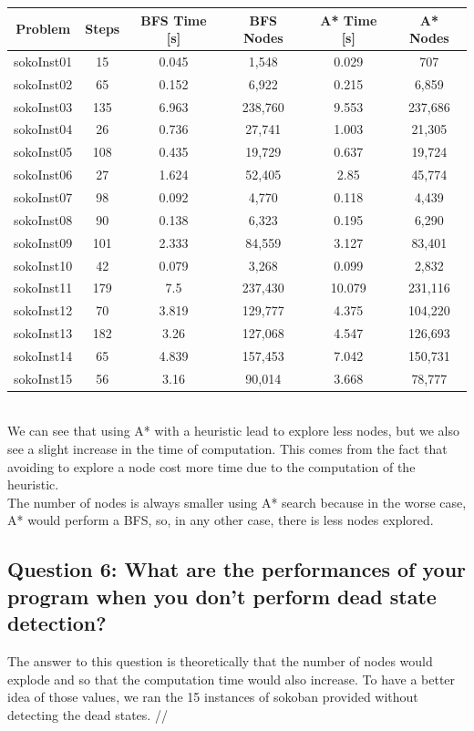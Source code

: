 \documentclass[a4paper,10pt]{article}
\begin{document}
			\begin{tabular}{|c||c||c|c||c|c|}
				\hline 
				\textbf{Problem} & \textbf{Steps} & \textbf{BFS Time [s]} & \textbf{BFS Nodes} & \textbf{A* Time [s]} & \textbf{A* Nodes} \\ 
				\hline 
				sokoInst01 & 15 & 0.045 & 1,548 & 0.029 & 707 \\ 
				\hline
				sokoInst02 & 65 & 0.152 & 6,922 & 0.215 & 6,859 \\ 
				\hline
				sokoInst03 & 135 & 6.963 & 238,760 & 9.553 & 237,686 \\ 
				\hline
				sokoInst04 & 26 & 0.736 & 27,741 & 1.003 & 21,305 \\ 
				\hline
				sokoInst05 & 108 & 0.435 & 19,729 & 0.637 & 19,724 \\ 
				\hline
				sokoInst06 & 27 & 1.624 & 52,405 & 2.85 & 45,774 \\ 
				\hline
				sokoInst07 & 98 & 0.092 & 4,770 & 0.118 & 4,439 \\ 
				\hline
				sokoInst08 & 90 & 0.138 & 6,323 & 0.195 & 6,290 \\ 
				\hline
				sokoInst09 & 101 & 2.333 & 84,559 & 3.127 & 83,401 \\ 
				\hline
				sokoInst10 & 42 & 0.079 & 3,268 & 0.099 & 2,832 \\ 
				\hline
				sokoInst11 & 179 & 7.5 & 237,430 & 10.079 & 231,116 \\ 
				\hline
				sokoInst12 & 70 & 3.819 & 129,777 & 4.375 & 104,220 \\ 
				\hline
				sokoInst13 & 182 & 3.26 & 127,068 & 4.547 & 126,693 \\ 
				\hline
				sokoInst14 & 65 & 4.839 & 157,453 & 7.042 & 150,731 \\ 
				\hline
				sokoInst15 & 56 & 3.16 & 90,014 & 3.668 & 78,777 \\ 
				\hline
			\end{tabular}\\
			
			We can see that using A* with a heuristic lead to explore less nodes, but we also see a slight increase in the time of computation. This comes from the fact that avoiding to explore a node cost more time due to the computation of the heuristic.\\
			The number of nodes is always smaller using A* search because in the worse case, A* would perform a BFS, so, in any other case, there is less nodes explored.
			
		\subsection{Question 6: What are the performances of your program when you don’t perform dead state detection?}
			The answer to this question is theoretically that the number of nodes would explode and so that the computation time would also increase. To have a better idea of those values, we ran the 15 instances of sokoban provided without detecting the dead states. //
			
\end{document}
